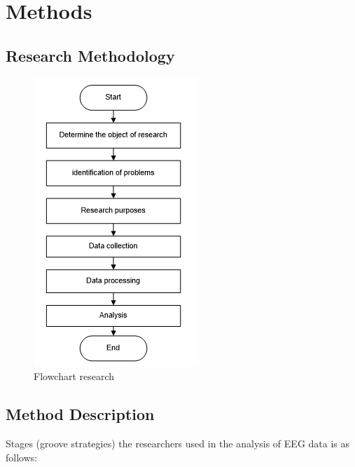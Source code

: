 \chapter{Methods}

\section{Research Methodology}
\begin{figure}[h!]
\centering
\includegraphics[scale=0.7]{figures/flowwc.PNG}
\caption{Flowchart research}
\label{labelgambar4}
\end{figure}

\section{Method Description}
Stages (groove strategies) the researchers used in the analysis of EEG data is as follows:

